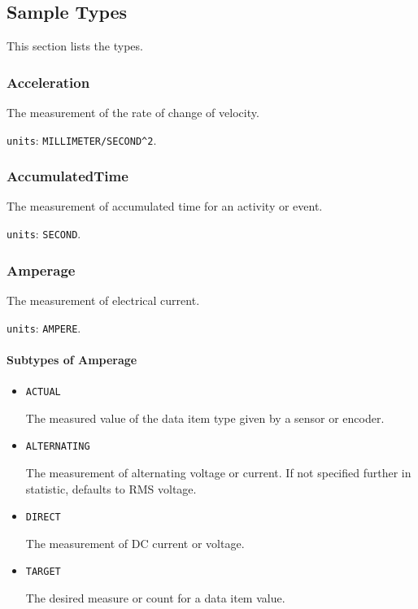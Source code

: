 \subsection{Sample Types} \label{sec:Sample Types}


This section lists the  types.


\subsubsection{Acceleration}
\label{sec:Acceleration}



The measurement of the rate of change of velocity.


\texttt{units}: \texttt{MILLIMETER/SECOND\^{}2}.


\subsubsection{AccumulatedTime}
\label{sec:AccumulatedTime}



The measurement of accumulated time for an activity or event.


\texttt{units}: \texttt{SECOND}.


\subsubsection{Amperage}
\label{sec:Amperage}



The measurement of electrical current.


\texttt{units}: \texttt{AMPERE}.

\paragraph{Subtypes of Amperage}\mbox{}
\label{sec:Subtypes of Amperage}

\begin{itemize}

\item \texttt{ACTUAL}


The measured value of the data item type given by a sensor or encoder.

\item \texttt{ALTERNATING}


The measurement of alternating voltage or current.   If not specified further in statistic, defaults to RMS voltage. 

\item \texttt{DIRECT}


The measurement of DC current or voltage.

\item \texttt{TARGET}


The desired measure or count for a data item value.


\end{itemize}







